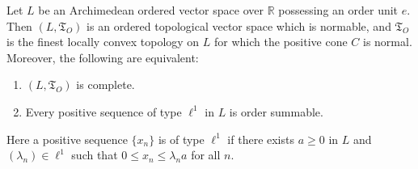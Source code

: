Let $L$ be an Archimedean ordered vector space over $\mathbb{R}$ possessing an order unit $e$. Then $(L, \mathfrak{T}_O)$ is an ordered topological vector space which is normable, and $\mathfrak{T}_O$ is the finest locally convex topology on $L$ for which the positive cone $C$ is normal. Moreover, the following are equivalent:
\begin{enumerate}
\item[(a)] $(L, \mathfrak{T}_O)$ is complete.
\item[(b)] Every positive sequence of type $\ell^1$ in $L$ is order summable.
\end{enumerate}

Here a positive sequence $\{x_n\}$ is of type $\ell^1$ if there exists $a \geq 0$ in $L$ and $(\lambda_n) \in \ell^1$ such that $0 \leq x_n \leq \lambda_n a$ for all $n$.
